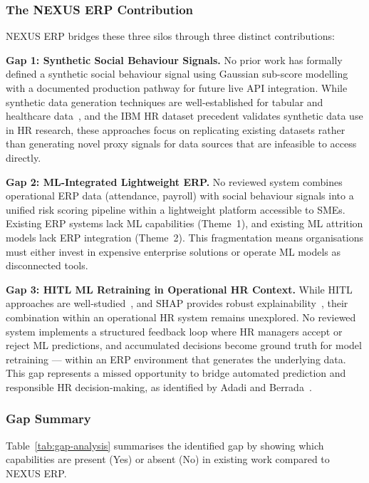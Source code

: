 \documentclass[12pt,a4paper]{article}
\begin{document}
\subsubsection{The NEXUS ERP Contribution}

NEXUS ERP bridges these three silos through three distinct contributions:

\textbf{Gap 1: Synthetic Social Behaviour Signals.} No prior work has formally defined a synthetic social behaviour signal using Gaussian sub-score modelling with a documented production pathway for future live API integration. While synthetic data generation techniques are well-established for tabular and healthcare data~\cite{figueira2024synthetic, gonzales2023synthetic, dahmen2019synsys}, and the IBM HR dataset precedent validates synthetic data use in HR research, these approaches focus on replicating existing datasets rather than generating novel proxy signals for data sources that are infeasible to access directly.

\textbf{Gap 2: ML-Integrated Lightweight ERP.} No reviewed system combines operational ERP data (attendance, payroll) with social behaviour signals into a unified risk scoring pipeline within a lightweight platform accessible to SMEs. Existing ERP systems lack ML capabilities (Theme~1), and existing ML attrition models lack ERP integration (Theme~2). This fragmentation means organisations must either invest in expensive enterprise solutions or operate ML models as disconnected tools.

\textbf{Gap 3: HITL ML Retraining in Operational HR Context.} While HITL approaches are well-studied~\cite{mosqueira2023hitl}, and SHAP provides robust explainability~\cite{lundberg2017shap}, their combination within an operational HR system remains unexplored. No reviewed system implements a structured feedback loop where HR managers accept or reject ML predictions, and accumulated decisions become ground truth for model retraining --- within an ERP environment that generates the underlying data. This gap represents a missed opportunity to bridge automated prediction and responsible HR decision-making, as identified by Adadi and Berrada~\cite{adadi2018xai}.

\subsubsection{Gap Summary}

Table~\ref{tab:gap-analysis} summarises the identified gap by showing which capabilities are present (Yes) or absent (No) in existing work compared to NEXUS ERP.
\end{document}
